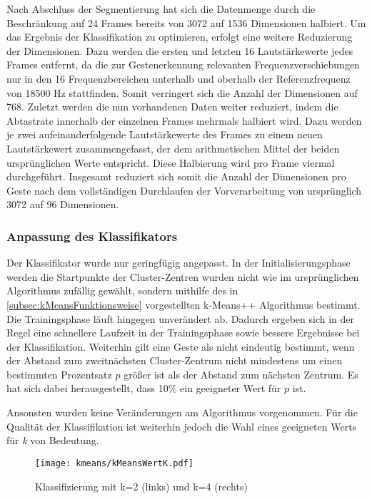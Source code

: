 Nach Abschluss der Segmentierung hat sich die Datenmenge durch die Beschränkung auf 24 Frames bereits von 3072 auf 1536 Dimensionen halbiert. Um das Ergebnis der Klassifikation zu optimieren, erfolgt eine weitere Reduzierung der Dimensionen. Dazu werden die ersten und letzten 16 Lautstärkewerte jedes Frames entfernt, da die zur Gestenerkennung relevanten Frequenzverschiebungen nur in den 16 Frequenzbereichen unterhalb und oberhalb der Referenzfrequenz von 18500 Hz stattfinden. Somit verringert sich die Anzahl der Dimensionen auf 768. Zuletzt werden die nun vorhandenen Daten weiter reduziert, indem die Abtastrate innerhalb der einzelnen Frames mehrmals halbiert wird. Dazu werden je zwei aufeinanderfolgende Lautstärkewerte des Frames zu einem neuen Lautstärkewert zusammengefasst, der dem arithmetischen Mittel der beiden ursprünglichen Werte entspricht. Diese Halbierung wird pro Frame viermal durchgeführt.
Insgesamt reduziert sich somit die Anzahl der Dimensionen pro Geste nach dem vollständigen Durchlaufen der Vorverarbeitung von ursprünglich 3072 auf 96 Dimensionen. 





\subsubsection{Anpassung des Klassifikators}
Der Klassifikator wurde nur geringfügig angepasst.
In der Initialisierungsphase werden die Startpunkte der Cluster-Zentren wurden nicht wie im ursprünglichen Algorithmus zufällig gewählt, sondern mithilfe des in \autoref{subsec:kMeansFunktionsweise} vorgestellten k-Means++ Algorithmus bestimmt. Die Trainingsphase läuft hingegen unverändert ab.
Dadurch ergeben sich in der Regel eine schnellere Laufzeit in der Trainingsphase sowie bessere Ergebnisse bei der Klassifikation.
Weiterhin gilt eine Geste als nicht eindeutig bestimmt, wenn der Abstand zum zweitnächsten Cluster-Zentrum nicht mindestens um einen bestimmten Prozentsatz $p$ größer ist als der Abstand zum nächsten Zentrum. Es hat sich dabei herausgestellt, dass 10\% ein geeigneter Wert für $p$ ist. %

Ansonsten wurden keine Veränderungen am Algorithmus vorgenommen.
Für die Qualität der Klassifikation ist weiterhin jedoch die Wahl eines geeigneten Werts für \emph{k} von Bedeutung.

\begin{figure*}[htbp]
    \centering
   \texttt{[image: kmeans/kMeansWertK.pdf]}
\caption{Klassifizierung mit k=2 (links) und k=4 (rechts)}
\label{fig:kMeansWertK}
\end{figure*}

